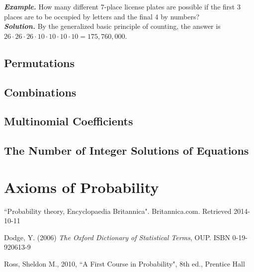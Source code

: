 \documentclass[a4paper,twocolumn]{article}
\begin{document}
\noindent\textbf{\textit{Example.}} How many different 7-place license plates are possible if the first 3 places are to be occupied by letters and the final 4 by numbers?\\
\noindent\textbf{\textit{Solution.}} By the generalized basic principle of counting, the answer is $26 \cdot 26 \cdot 26 \cdot 10 \cdot 10 \cdot 10 \cdot 10 = 175,760,000$.



\subsection{Permutations}
\subsection{Combinations}
\subsection{Multinomial Coefficients}
\subsection{The Number of Integer Solutions of Equations}


\section{Axioms of Probability}


\begin{thebibliography}{9}
         ``Probability theory, Encyclopaedia Britannica".
         Britannica.com.
         Retrieved 2014-10-11

        Dodge, Y. (2006)
        \textit{The Oxford Dictionary of Statistical Terms}, OUP.
        ISBN 0-19-920613-9

        Ross, Sheldon M.,
        2010,
        ``A First Course in Probability", 8th ed.,
        Prentice Hall
\end{thebibliography}
\end{document}
